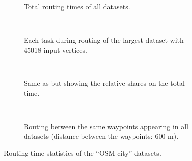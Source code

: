 			\clearpage
			\begin{figure}[h!]
				\begin{figcenter}
					\begin{subfigure}[t]{\textwidth}
						\begin{figcenter}
							
						\end{figcenter}
						\caption{Total routing times of all datasets.}
						\label{fig:eval-city-routing-details-a}
					\end{subfigure}
					\\[3ex]
					\begin{subfigure}[t]{\textwidth}
						\begin{figcenter}
							
						\end{figcenter}
						\caption{Each task during routing of the largest dataset with 45018 input vertices.}
						\label{fig:eval-city-routing-details-b}
					\end{subfigure}
					\\[3ex]
					\begin{subfigure}[t]{\textwidth}
						\begin{figcenter}
							
						\end{figcenter}
						\caption{Same as  but showing the relative shares on the total time.}
					\end{subfigure}
					\\[3ex]
					\begin{subfigure}[t]{\textwidth}
						\begin{figcenter}
							
						\end{figcenter}
						\caption{Routing between the same waypoints appearing in all datasets (distance between the waypoints: 600 m).}
					\end{subfigure}
				\end{figcenter}
				\caption{Routing time statistics of the \enquote{OSM city} datasets.}
				\label{fig:eval-city-routing-details}
			\end{figure}
			
